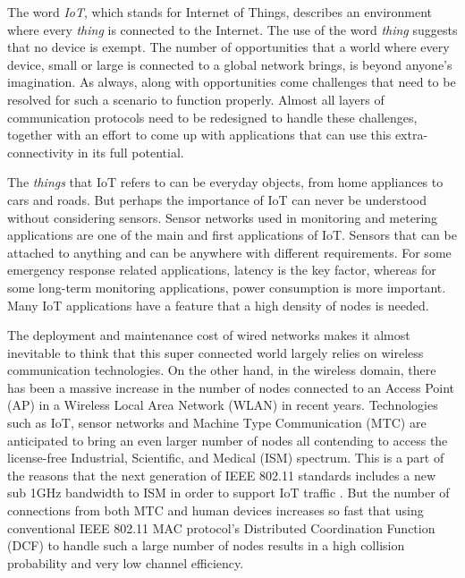 \label{chapter:introduction}

The word \textit{IoT}, which stands for Internet of Things, describes an environment where every \textit{thing} is connected to the Internet. The use of the word \textit{thing} suggests that no device is exempt. The number of opportunities that a world where every device, small or large is connected to a global network brings, is beyond anyone's imagination. As always, along with opportunities come challenges that need to be resolved for such a scenario to function properly. Almost all layers of communication protocols need to be redesigned to handle these challenges, together with an effort to come up with applications that can use this extra-connectivity in its full potential.

The \textit{things} that IoT refers to can be everyday objects, from home appliances to cars and roads. But perhaps the importance of IoT can never be understood without considering sensors. Sensor networks used in monitoring and metering applications are one of the main and first applications of IoT. Sensors that can be attached to anything and can be anywhere with different requirements. For some emergency response related applications, latency is the key factor, whereas for some long-term monitoring applications, power consumption is more important. Many IoT applications have a feature that a high density of nodes is needed.


The deployment and maintenance cost of wired networks makes it almost inevitable to think that this super connected world largely relies on wireless communication technologies. On the other hand, in the wireless domain, there has been a massive increase in the number of nodes connected to an Access Point (AP) in a Wireless Local Area Network (WLAN) in recent years. Technologies such as IoT, sensor networks and Machine Type Communication (MTC) are anticipated to bring an even larger number of nodes all contending to access the license-free Industrial, Scientific, and Medical (ISM) spectrum. This is a part of the reasons that the next generation of IEEE 802.11 standards includes a new sub 1GHz bandwidth to ISM in order to support IoT traffic \cite{Req80211ah}. But the number of connections from both MTC and human devices increases so fast that using conventional IEEE 802.11 MAC protocol's Distributed Coordination Function (DCF) to handle such a large number of nodes results in a high collision probability and very low channel efficiency.

